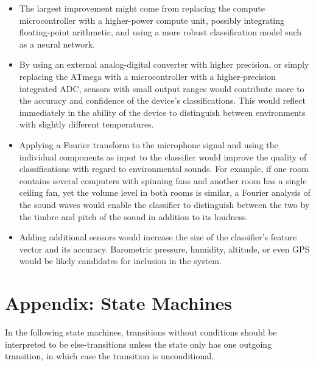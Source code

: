 \documentclass{article}
\begin{document}
\begin{itemize}

  \item The largest improvement might come from replacing the compute
    microcontroller with a higher-power compute unit, possibly
    integrating floating-point arithmetic, and using a more robust
    classification model such as a neural network.

  \item By using an external analog-digital converter with higher
    precision, or simply replacing the ATmega with a microcontroller
    with a higher-precision integrated ADC, sensors with small output
    ranges would contribute more to the accuracy and confidence of the
    device's classifications.  This would reflect immediately in the
    ability of the device to distinguish between environments with
    slightly different temperatures.

  \item Applying a Fourier transform to the microphone signal and using
    the individual components as input to the classifier would improve
    the quality of classifications with regard to environmental sounds.
    For example, if one room contains several computers with spinning
    fans and another room has a single ceiling fan, yet the volume level
    in both rooms is similar, a Fourier analysis of the sound waves
    would enable the classifier to distinguish between the two by the
    timbre and pitch of the sound in addition to its loudness.

  \item Adding additional sensors would increase the size of the
    classifier's feature vector and its accuracy.  Barometric pressure,
    humidity, altitude, or even GPS would be likely candidates for
    inclusion in the system.

\end{itemize}

\appendix

\section{Appendix: State Machines}
\label{app.sm}

\togglefalse{TASKSPECONLY}

In the following state machines, transitions without conditions should
be interpreted to be else-transitions unless the state only has one
outgoing transition, in which case the transition is unconditional.
\end{document}
